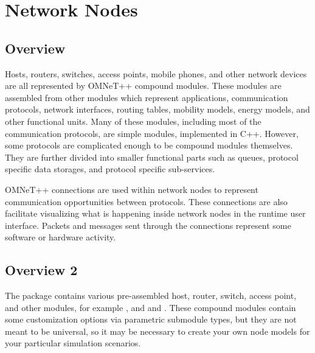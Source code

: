 \chapter{Network Nodes}
\label{cha:network-nodes}




\section{Overview}

Hosts, routers, switches, access points, mobile phones, and other network
devices are all represented by OMNeT++ compound modules. These modules are
assembled from other modules which represent applications, communication
protocols, network interfaces, routing tables, mobility models, energy
models, and other functional units. Many of these modules, including most
of the communication protocols, are simple modules, implemented in C++.
However, some protocols are complicated enough to be compound modules
themselves. They are further divided into smaller functional parts such as
queues, protocol specific data storages, and protocol specific
sub-services.

OMNeT++ connections are used within network nodes to represent
communication opportunities between protocols. These connections are
also facilitate  visualizing what is happening inside network nodes in
the runtime user interface. Packets and messages sent through the connections
represent some software or hardware activity.

\section{Overview 2}

The  package contains various pre-assembled host, router,
switch, access point, and other modules, for example
,  and  and
. These compound modules contain some customization
options via parametric submodule types, but they are not meant to be
universal, so it may be necessary to create your own node models for
your particular simulation scenarios.

